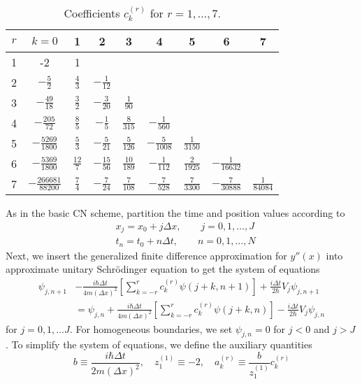 \documentclass[11pt, a4paper]{article}
\newcommand{\schro}{Schr\"{o}dinger\xspace}
\begin{document}
\begin{table}[htb!]
\centering 
\begin{tabular}{c | c c c c c c c c}
\hline \hline
$ r $ & $ k=0 $ & 1 & 2 & 3 & 4 & 5 & 6 & 7 \\
\hline
1 & -2 & 1 & & & & & & \\
2 & $ -\frac{5}{2} $ & $ \frac{4}{3} $ & $ -\frac{1}{12} $ & & & & & \\
3 & $ -\frac{49}{18} $ & $ \frac{3}{2} $ & $ -\frac{3}{20} $ & $ \frac{1}{90} $ & & & &\\
4 & $ -\frac{205}{72} $ & $ \frac{8}{5} $ & $ -\frac{1}{5} $ & $ \frac{8}{315} $ & $ -\frac{1}{560} $& & &\\
5 & $ -\frac{5269}{1800} $ & $ \frac{5}{3} $ & $ -\frac{5}{21} $ & $ \frac{5}{126} $ & $ -\frac{5}{1008} $& $ \frac{1}{3150} $ & &\\
6 & $ -\frac{5369}{1800} $ & $ \frac{12}{7} $ & $ -\frac{15}{56} $ & $ \frac{10}{189} $ & $ -\frac{1}{112} $& $ \frac{2}{1925} $ &$ -\frac{1}{16632} $ &\\
7 & $ -\frac{266681}{88200} $ & $ \frac{7}{4} $ & $ -\frac{7}{24} $ & $ \frac{7}{108} $ & $ -\frac{7}{528} $& $ \frac{7}{3300} $ &$ -\frac{7}{30888} $ & $ \frac{1}{84084} $
\end{tabular}
\caption{Coefficients $ c_{k}^{(r)} $ for $ r = 1, \ldots, 7 $.}
\label{diff:table:ck}
\end{table}
As in the basic CN scheme, partition the time and position values according to
\begin{align*}
	&x_{j} = x_{0} + j\Delta x, \qquad j = 0, 1, \ldots, J\\
	&t_{n} = t_{0} + n\Delta t, \qquad n = 0, 1, \ldots, N
\end{align*}
Next, we insert the generalized finite difference approximation for $ y''(x) $ into approximate unitary \schro equation to get the system of equations
\begin{align*}
	\psi_{j, n+1} &- \frac{i\hbar \Delta t}{4m(\Delta x)^{2}} \left[\sum_{k=-r}^{r}c_{k}^{(r)}\psi(j+k, n+1)\right] + \frac{i\Delta t}{2\hbar}V_{j}\psi_{j, n+1}\\
	& = \psi_{j, n} + \frac{i\hbar \Delta t}{4m(\Delta x)^{2}} \left[\sum_{k=-r}^{r}c_{k}^{(r)}\psi(j+k, n)\right] - \frac{i\Delta t}{2\hbar}V_{j}\psi_{j, n}
\end{align*}
for $ j = 0, 1, \ldots J $. For homogeneous boundaries, we set $ \psi_{j, n} = 0 $ for $ j < 0 $ and $ j > J $. To simplify the system of equations, we define the auxiliary quantities
\begin{equation}
	b \equiv \frac{i\hbar \Delta t}{2m(\Delta x)^{2}}, \quad z_{1}^{(1)} \equiv -2, \quad a_{k}^{(r)} \equiv \frac{b}{z_{1}^{(1)}}c_{k}^{(r)} \label{diff:eq:abz}
\end{equation}
\end{document}
